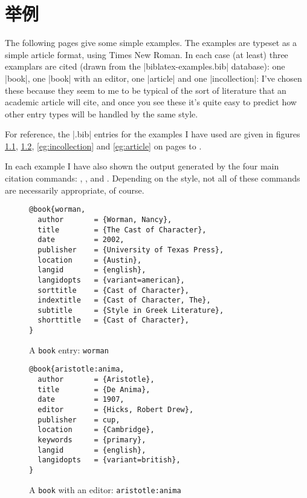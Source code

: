 \appendix

\chapter{举例}
\label{chapter:examples}

The following pages give some simple examples. The examples are
typeset as a simple article format, using Times New Roman. In each
case (at least) three examplars are cited (drawn from the
|biblatex-examples.bib| database): one |book|, one |book| with an
editor, one |article| and one |incollection|: I've chosen these
because they seem to me to be typical of the sort of literature that
an academic article will cite, and once you see these it's quite easy
to predict how other entry types will be handled by the same style.

For reference, the |.bib| entries for the examples I have used are
given in figures \ref{eg:book}, \ref{eg:book2}, \ref{eg:incollection}
and \ref{eg:article} on pages \pageref{eg:book} to
\pageref{eg:article}.

In each example I have also shown the output generated by the four
main citation commands: , ,  and
. Depending on the style, not all of these commands are
necessarily appropriate, of course.

\begin{figure}
\begin{Verbatim}[frame=single,fontsize=\small]
@book{worman,
  author       = {Worman, Nancy},
  title        = {The Cast of Character},
  date         = 2002,
  publisher    = {University of Texas Press},
  location     = {Austin},
  langid       = {english},
  langidopts   = {variant=american},
  sorttitle    = {Cast of Character},
  indextitle   = {Cast of Character, The},
  subtitle     = {Style in Greek Literature},
  shorttitle   = {Cast of Character},
}
\end{Verbatim}
\caption{A \texttt{book} entry: \texttt{worman}\label{eg:book}}
\end{figure}

\begin{figure}
\begin{Verbatim}[frame=single, fontsize=\small]
@book{aristotle:anima,
  author       = {Aristotle},
  title        = {De Anima},
  date         = 1907,
  editor       = {Hicks, Robert Drew},
  publisher    = cup,
  location     = {Cambridge},
  keywords     = {primary},
  langid       = {english},
  langidopts   = {variant=british},
}
\end{Verbatim}
\caption{A \texttt{book} with an editor: \texttt{aristotle:anima}\label{eg:book2}}
\end{figure}

